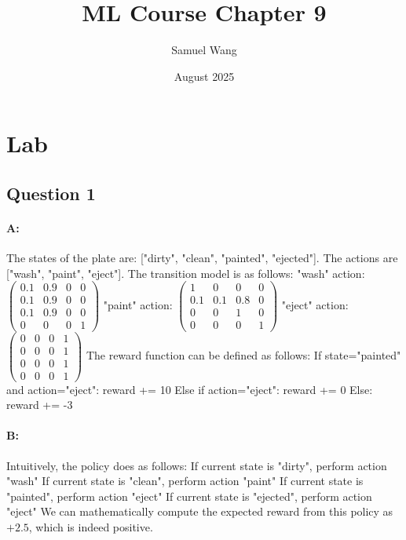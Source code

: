 \documentclass{article}
\title{ML Course Chapter 9}
\author{Samuel Wang}
\date{August 2025}
\begin{document}
\maketitle

\section{Lab}

\subsection{Question 1}

\paragraph{A: } The states of the plate are: ["dirty", "clean", "painted", "ejected"]. The actions are ["wash", "paint", "eject"]. \newline
The transition model is as follows:\newline
"wash" action:
$\begin{pmatrix}
    0.1 & 0.9 & 0 & 0 \\
    0.1 & 0.9 & 0 & 0 \\
    0.1 & 0.9 & 0 & 0 \\
    0 & 0 & 0 & 1
\end{pmatrix}$ \newline
"paint" action:
$\begin{pmatrix}
    1 & 0 & 0 & 0 \\
    0.1 & 0.1 & 0.8 & 0 \\
    0 & 0 & 1 & 0 \\
    0 & 0 & 0 & 1
\end{pmatrix}$ \newline
"eject" action:
$\begin{pmatrix}
    0 & 0 & 0 & 1 \\
    0 & 0 & 0 & 1 \\
    0 & 0 & 0 & 1 \\
    0 & 0 & 0 & 1
\end{pmatrix}$ \newline
The reward function can be defined as follows: \newline
If state="painted" and action="eject": reward += 10 \newline
Else if action="eject": reward += 0 \newline
Else: reward += -3

\paragraph{B: } Intuitively, the policy does as follows: \newline
If current state is "dirty", perform action "wash" \newline
If current state is "clean", perform action "paint" \newline
If current state is "painted", perform action "eject" \newline
If current state is "ejected", perform action "eject" \newline
We can mathematically compute the expected reward from this policy as $+2.5$, which is indeed positive.
\end{document}
